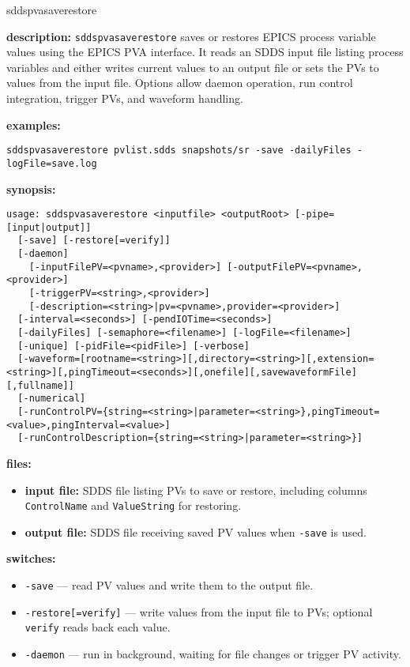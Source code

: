 \begin{sddsprog}{sddspvasaverestore}
\item \textbf{description:}
  \verb+sddspvasaverestore+ saves or restores EPICS process variable values using the EPICS PVA
  interface. It reads an SDDS input file listing process variables and either writes current
  values to an output file or sets the PVs to values from the input file. Options allow daemon
  operation, run control integration, trigger PVs, and waveform handling.
\item \textbf{examples:}
\begin{verbatim}
sddspvasaverestore pvlist.sdds snapshots/sr -save -dailyFiles -logFile=save.log
\end{verbatim}
\item \textbf{synopsis:}
\begin{verbatim}
usage: sddspvasaverestore <inputfile> <outputRoot> [-pipe=[input|output]]
  [-save] [-restore[=verify]]
  [-daemon]
    [-inputFilePV=<pvname>,<provider>] [-outputFilePV=<pvname>,<provider>]
    [-triggerPV=<string>,<provider>]
    [-description=<string>|pv=<pvname>,provider=<provider>]
  [-interval=<seconds>] [-pendIOTime=<seconds>]
  [-dailyFiles] [-semaphore=<filename>] [-logFile=<filename>]
  [-unique] [-pidFile=<pidFile>] [-verbose]
  [-waveform=[rootname=<string>][,directory=<string>][,extension=<string>][,pingTimeout=<seconds>][,onefile][,savewaveformFile][,fullname]]
  [-numerical]
  [-runControlPV={string=<string>|parameter=<string>},pingTimeout=<value>,pingInterval=<value>]
  [-runControlDescription={string=<string>|parameter=<string>}]
\end{verbatim}
\item \textbf{files:}
\begin{itemize}
  \item \textbf{input file:} SDDS file listing PVs to save or restore, including columns \verb|ControlName| and \verb|ValueString| for restoring.
  \item \textbf{output file:} SDDS file receiving saved PV values when \texttt{-save} is used.
\end{itemize}
\item \textbf{switches:}
\begin{itemize}
  \item {\tt -save} --- read PV values and write them to the output file.
  \item {\tt -restore[=verify]} --- write values from the input file to PVs; optional {\tt verify} reads back each value.
  \item {\tt -daemon} --- run in background, waiting for file changes or trigger PV activity.

\end{itemize}
\end{sddsprog}
